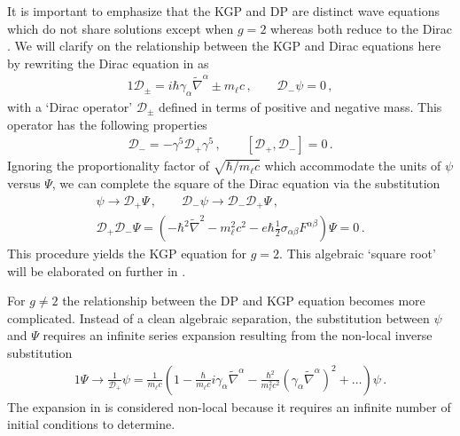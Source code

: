 It is important to emphasize that the KGP  and DP  are distinct wave equations which do not share solutions except when $g\!=\!2$ whereas both reduce to the Dirac . We will clarify on the relationship between the KGP and Dirac equations here by rewriting the Dirac equation in  as
\begin{alignat}{1}
	\label{do:1} \mathcal{D}_{\pm}=i\hbar\gamma_{\alpha}\widetilde\nabla^{\alpha}\pm m_{\ell}c\,,\qquad
    \mathcal{D}_{-}\psi=0\,,
\end{alignat}
with a `Dirac operator' $\mathcal{D}_{\pm}$ defined in terms of positive and negative mass. This operator has the following properties
\begin{gather}
    \label{do:2}
    \mathcal{D}_{-}=-\gamma^{5}\mathcal{D}_{+}\gamma^{5}\,,\qquad
    [\mathcal{D}_{+},\mathcal{D}_{-}]=0\,.
\end{gather}
Ignoring the proportionality factor of $\sqrt{\hbar/m_{\ell}c}$ which accommodate the units of $\psi$ versus $\Psi$, we can complete the square of the Dirac equation via the substitution
\begin{gather}
    \label{do:3a}
    \psi\rightarrow\mathcal{D}_{+}\Psi\,,\qquad
    \mathcal{D}_{-}\psi \rightarrow \mathcal{D}_{-}\mathcal{D}_{+}\Psi\,,\\
	\label{do:3}
    \mathcal{D}_{+}\mathcal{D}_{-}\Psi=\left(-\hbar^{2}\widetilde\nabla^{2}-m_{\ell}^{2}c^{2}-e\hbar\frac{1}{2}\sigma_{\alpha\beta}F^{\alpha\beta}\right)\Psi=0\,.
\end{gather}
This procedure yields the KGP equation for $g\!=\!2$. This algebraic `square root' will be elaborated on further in .

For $g\!\neq\!2$ the relationship between the DP and KGP equation becomes more complicated. Instead of a clean algebraic separation, the substitution between $\psi$ and $\Psi$ requires an infinite series expansion resulting from the non-local inverse substitution 
\begin{alignat}{1}
	\label{nonlocal:1} \Psi\rightarrow\frac{1}{\mathcal{D}_{+}}\psi = \frac{1}{m_{\ell}c}\left(1 - \frac{\hbar}{m_{\ell}c}i\gamma_{\alpha}\widetilde\nabla^{\alpha} - \frac{\hbar^{2}}{m_{\ell}^{2}c^{2}}\left(\gamma_{\alpha}\widetilde\nabla^{\alpha}\right)^{2} + \ldots\right)\psi\,.
\end{alignat}
The expansion in  is considered non-local because it requires an infinite number of initial conditions to determine.

